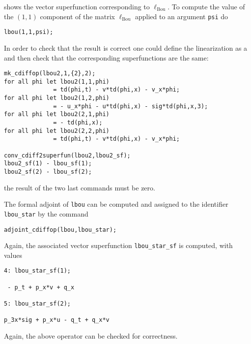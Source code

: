 shows the vector superfunction corresponding to $\ell_{\text{Bou}}$. To compute
the value of the $(1,1)$ component of the matrix $\ell_{\text{Bou}}$ applied to
an argument \texttt{psi} do
\begin{verbatim}
lbou(1,1,psi);
\end{verbatim}
In order to check that the result is correct one could define the linearization
as a \cdiffop and then check that the corresponding superfunctions are the
same:
\begin{verbatim}
mk_cdiffop(lbou2,1,{2},2);
for all phi let lbou2(1,1,phi)
              = td(phi,t) - v*td(phi,x) - v_x*phi;
for all phi let lbou2(1,2,phi)
              = - u_x*phi - u*td(phi,x) - sig*td(phi,x,3);
for all phi let lbou2(2,1,phi)
              = - td(phi,x);
for all phi let lbou2(2,2,phi)
              = td(phi,t) - v*td(phi,x) - v_x*phi;

conv_cdiff2superfun(lbou2,lbou2_sf);
lbou2_sf(1) - lbou_sf(1);
lbou2_sf(2) - lbou_sf(2);
\end{verbatim}
the result of the two last commands must be zero.

The formal adjoint of \texttt{lbou} can be computed and assigned to the
identifier \texttt{lbou\_star} by the command
\begin{verbatim}
adjoint_cdiffop(lbou,lbou_star);
\end{verbatim}
Again, the associated vector superfunction \texttt{lbou\_star\_sf} is computed,
with values
\begin{verbatim}
4: lbou_star_sf(1);

 - p_t + p_x*v + q_x

5: lbou_star_sf(2);

p_3x*sig + p_x*u - q_t + q_x*v
\end{verbatim}
Again, the above operator can be checked for correctness.

